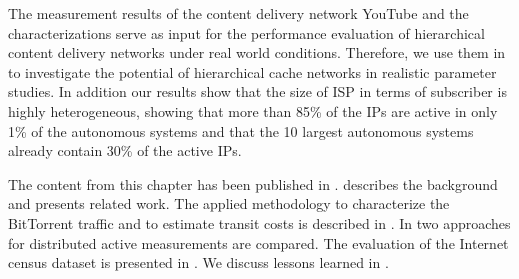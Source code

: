
The measurement results of the content delivery network YouTube and the characterizations serve as input for the performance evaluation of hierarchical content delivery networks under real world conditions.
Therefore, we use them in  to investigate the potential of hierarchical cache networks in realistic parameter studies.
In addition our results show that the size of ISP in terms of subscriber is highly heterogeneous, showing that more than 85\% of the IPs are active in only 1\% of the autonomous systems and that the 10 largest autonomous systems already contain 30\% of the active IPs.


The content from this chapter has been published in \cite{burger2012profit,burger2014vantage,burger2016hierarchical}.
 describes the background and presents related work.
The applied methodology to characterize the BitTorrent traffic and to estimate transit costs is described in .
In  two approaches for distributed active measurements are compared.
The evaluation of the Internet census dataset is presented in .
We discuss lessons learned in .






